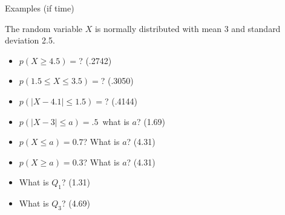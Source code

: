 \begin{frame}{Examples (if time)}

  The random variable $X$ is normally distributed with mean 3 and
  standard deviation 2.5.
  \begin{itemize}
  \item $p(X \geq 4.5)=$? (.2742)
  \item $p(1.5\leq X \leq 3.5)=$? (.3050)
  \item $p(|X-4.1|\leq 1.5)=$? (.4144)
  \item $p(|X-3|\leq a)=.5$\ what is $a$? (1.69)
  \item $p(X\leq a) = 0.7$? What is $a$? (4.31)
  \item $p(X\geq a) = 0.3$? What is $a$? (4.31)
  \item What is $Q_1$? (1.31)
  \item What is $Q_3$? (4.69)
  \end{itemize}
  
\end{frame}

